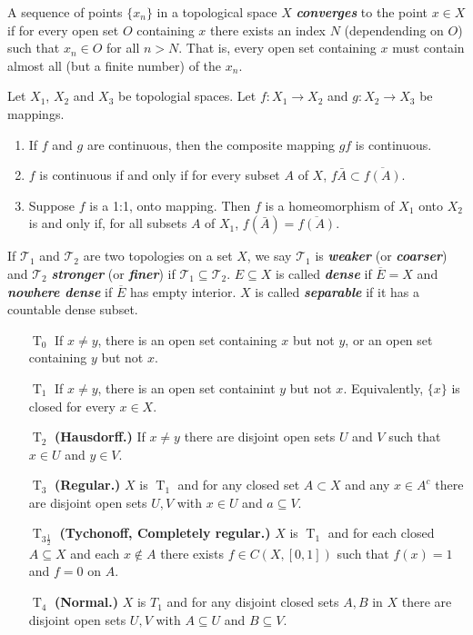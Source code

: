 \documentclass{article}
\theoremstyle{definition}
\numberwithin{equation}{section}
\begin{document}
	A sequence of points $\{x_n\}$ in a topological space $X$ \textbf{\textit{converges}} to the point $x\in X$ if for every open set $O$ containing $x$ there exists an index $N$ (dependending on $O$) such that $x_n\in O$ for all $n>N$. That is, every open set containing $x$ must contain almost all (but a finite number) of the $x_n$.
	
	\begin{prop} Let $X_1$, $X_2$ and $X_3$ be topologial spaces. Let $f:X_1\to X_2$ and $g:X_2\to X_3$ be mappings.
		\begin{enumerate} 
			\item If $f$ and $g$ are continuous, then the composite mapping $gf$ is continuous.
			\item $f$ is continuous if and only if for every subset $A$ of $X$, $f\bar{A}\subset\overline{f(A)}$.
			\item Suppose $f$ is a 1:1, onto mapping. Then $f$ is a homeomorphism of $X_1$ onto $X_2$ is and only if, for all subsets $A$ of $X_1$, $f(\bar{A})=\overline{f(A)}$.
		\end{enumerate}
	\end{prop}
	
	
	If $\mathcal{T}_1$ and $\mathcal{T}_2$ are two topologies on a set $X$, we say $\mathcal{T}_1$ is \textbf{\textit{weaker}} (or \textbf{\textit{coarser}}) and $\mathcal{T}_2$ \textbf{\textit{stronger}} (or \textbf{\textit{finer}}) if $\mathcal{T}_1\subseteq\mathcal{T}_2$. $E\subseteq X$ is called \textbf{\textit{dense}} if $\overline{E}=X$ and \textbf{\textit{nowhere dense}} if $\overline{E}$ has empty interior. $X$ is called \textbf{\textit{separable}} if it has a countable dense subset. 
	
	\begin{enumerate}
		\item[$\operatorname{T}_0$] If $x\neq y$, there is an open set containing $x$ but not $y$, or an open set containing $y$ but not $x$.
		\item[$\operatorname{T}_1$] If $x\neq y$, there is an open set containint $y$ but not $x$. Equivalently, $\{x\}$ is closed for every $x\in X$.
		\item[$\operatorname{T}_2$] \textbf{(Hausdorff.)} If $x\neq y$ there are disjoint open sets $U$ and $V$ such that $x\in U$ and $y\in V$.
		\item[$\operatorname{T}_3$] \textbf{(Regular.)} $X$ is $\operatorname{T}_1$ and for any closed set $A\subset X$ and any $x\in A^c$ there are disjoint open sets $U,V$ with $x\in U$ and $a\subseteq V$.
		\item[$\operatorname{T}_{3\frac{1}{2}}$] \textbf{(Tychonoff, Completely regular.)} $X$ is $\operatorname{T}_1$ and for each closed $A\subseteq X$ and each $x\notin A$ there exists $f\in C(X,[0,1])$ such that $f(x)=1$ and $f=0$ on $A$.
		\item[$\operatorname{T}_4$] \textbf{(Normal.)} $X$ is $T_1$ and for any disjoint closed sets $A,B$ in $X$ there are disjoint open sets $U,V$ with $A\subseteq U$ and $B\subseteq V$.
	\end{enumerate}
	
\end{document}
